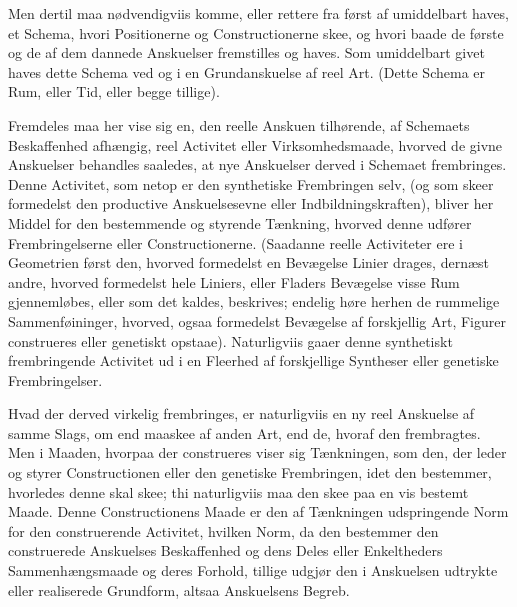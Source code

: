 \documentclass[12pt]{book}
\def\textit#1{#1}%
\def\emph#1{#1}%
\newcommand{\opage}[1]{\marginnote{\footnotesize\textit{[#1]}}}
\begin{document}
Men dertil maa nødvendigviis komme, eller rettere fra først af umiddelbart haves, et
Schema, hvori Positionerne og Constructionerne skee, og hvori baade de første og de af
dem dannede Anskuelser fremstilles og haves. Som umiddelbart givet haves dette Schema
ved og i en Grundanskuelse af reel Art. (Dette Schema er Rum, eller Tid, eller begge
tillige).

Fremdeles maa her vise sig en, den reelle Anskuen tilhørende, af Schemaets
Beskaffenhed afhængig, reel Activitet eller Virksomhedsmaade, hvorved de givne
Anskuelser behandles saaledes, at nye Anskuelser derved i Schemaet frembringes. Denne
Activitet, som netop er den \emph{synthetiske Frembringen selv}, (og som skeer
formedelst den productive Anskuelsesevne eller Indbildningskraften), bliver her Middel
for den bestemmende og styrende Tænkning, hvorved denne udfører Frembringelserne eller
Constructionerne. (Saadanne reelle Activiteter ere i Geometrien først den, hvorved
formedelst en Bevægelse Linier drages, dernæst andre, hvorved formedelst
\opage{159} hele Liniers, eller Fladers Bevægelse visse Rum gjennemløbes, eller som det kaldes,
beskrives; endelig høre herhen de rummelige Sammenføininger, hvorved, ogsaa formedelst
Bevægelse af forskjellig Art, Figurer construeres eller genetiskt opstaae).
Naturligviis gaaer denne synthetiskt frembringende Activitet ud i en Fleerhed af
forskjellige Syntheser eller genetiske Frembringelser.

Hvad der derved virkelig frembringes, er naturligviis en ny reel Anskuelse af samme
\emph{Slags}, om end maaskee af anden Art, end de, hvoraf den frembragtes. Men i
Maaden, hvorpaa der construeres viser sig Tænkningen, som den, der leder og styrer
Constructionen eller den genetiske Frembringen, idet den bestemmer, hvorledes denne
skal skee; thi naturligviis maa den skee paa en vis bestemt Maade. Denne
\emph{Constructionens} Maade er den af Tænkningen udspringende \emph{Norm} for den
construerende Activitet, hvilken Norm, da den bestemmer den construerede Anskuelses
Beskaffenhed og dens Deles eller Enkeltheders Sammenhængsmaade og deres Forhold,
tillige udgjør den i Anskuelsen udtrykte eller realiserede Grundform, altsaa
Anskuelsens Begreb.
\end{document}
